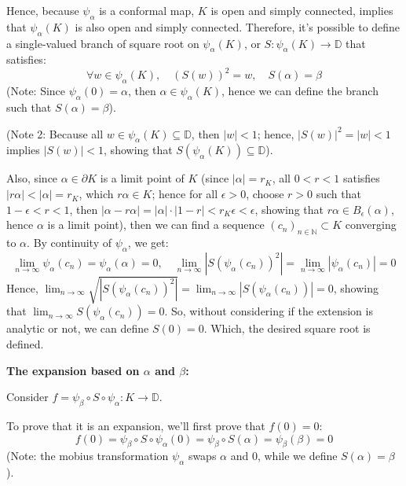 \documentclass{article}
\begin{document}
\begin{itemize}
    Hence, because $\psi_\alpha$ is a conformal map, $K$ is open and simply connected, implies that $\psi_\alpha(K)$ is also open and simply connected.
    Therefore, it's possible to define a single-valued branch of square root on $\psi_\alpha(K)$, or $S:\psi_\alpha(K)\rightarrow\mathbb{D}$ that satisfies:
    $$\forall w\in\psi_\alpha(K),\quad (S(w))^2=w,\quad S(\alpha)=\beta$$
    (Note: Since $\psi_\alpha(0)=\alpha$, then $\alpha\in \psi_\alpha(K)$, hence we can define the branch such that $S(\alpha)=\beta$).

    (Note 2: Because all $w\in \psi_\alpha(K)\subseteq \mathbb{D}$, then $|w|<1$; hence, $|S(w)|^2 = |w| <1$ implies $|S(w)|<1$, showing that $S(\psi_\alpha(K))\subseteq \mathbb{D}$).
    
    Also, since $\alpha\in \partial K$ is a limit point of $K$ (since $|\alpha|=r_K$, all $0<r<1$ satisfies $|r\alpha|<|\alpha|=r_K$, which $r\alpha \in K$; hence for all $\epsilon>0$, choose $r>0$ such that $1-\epsilon<r<1$, then $|\alpha-r\alpha|=|\alpha|\cdot|1-r| <r_K\epsilon<\epsilon$, showing that $r\alpha\in B_\epsilon(\alpha)$, hence $\alpha$ is a limit point),
    then we can find a sequence $(c_n)_{n\in\mathbb{N}}\subset K$ converging to $\alpha$. By continuity of $\psi_\alpha$, we get:
    $$\lim_{n\rightarrow\infty}\psi_{\alpha}(c_n)=\psi_\alpha(\alpha)=0,\quad \lim_{n\rightarrow\infty}|S(\psi_\alpha(c_n))^2|=\lim_{n\rightarrow\infty}|\psi_\alpha(c_n)|=0$$
    Hence, $\lim_{n\rightarrow\infty}\sqrt{|S(\psi_\alpha(c_n))^2|}=\lim_{n\rightarrow\infty}|S(\psi_\alpha(c_n))|=0$, showing that $\lim_{n\rightarrow\infty}S(\psi_\alpha(c_n))=0$.
    So, without considering if the extension is analytic or not, we can define $S(0)=0$. Which, the desired square root is defined.

    \textbf{The expansion based on $\alpha$ and $\beta$:}

    Consider $f=\psi_\beta\circ S\circ \psi_\alpha:K\rightarrow\mathbb{D}$. 
    
    To prove that it is an expansion, we'll first prove that $f(0)=0$:
    $$f(0)=\psi_\beta\circ S\circ \psi_\alpha(0)=\psi_\beta\circ S(\alpha)=\psi_\beta(\beta)=0$$
    (Note: the mobius transformation $\psi_\alpha$ swaps $\alpha$ and $0$, while we define $S(\alpha)=\beta$).
    

\end{itemize}
\end{document}
